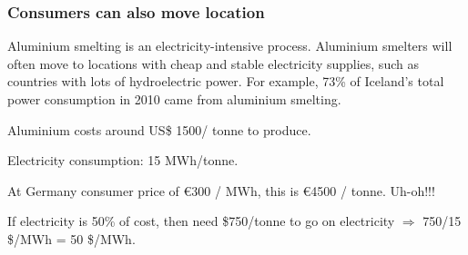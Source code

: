 \documentclass[10pt,dvipsnames]{beamer}
\begin{document}
\begin{frame}
  \frametitle{Consumers can also move location}

  Aluminium smelting is an electricity-intensive process. Aluminium
  smelters will often move to locations with cheap and stable
  electricity supplies, such as countries with lots of hydroelectric
  power.  For example, 73\% of Iceland's total power consumption in
  2010 came from aluminium smelting.

  Aluminium costs around US\$ 1500/ tonne to produce. %

  Electricity consumption: 15 MWh/tonne.

  At Germany consumer price of \euro 300 / MWh, this is \euro 4500 / tonne. Uh-oh!!!

  If electricity is 50\% of cost, then need \$750/tonne to go on electricity $\Rightarrow$ 750/15 \$/MWh = 50 \$/MWh.













  \end{frame}
\end{document}
